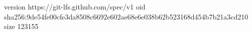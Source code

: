 version https://git-lfs.github.com/spec/v1
oid sha256:9de54fe00cfe3da8508c6692e602ae68e6e038b62b523168d454b7b21a3cd210
size 123155
